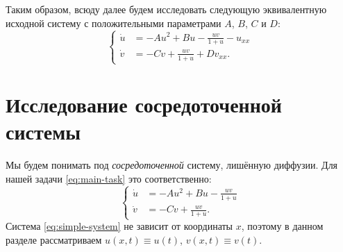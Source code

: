 \documentclass[a4paper, 11pt]{article}
\begin{document}
	Таким образом, всюду далее будем исследовать следующую эквивалентную исходной систему с положительными параметрами $A$, $B$, $C$ и $D$:
	\begin{equation}\label{eq:main-task}
		\left\{\begin{aligned}
		\dot u &= -A u^2 + B u - \frac{uv}{1+u} - u_{xx}\\
		\dot v &= -C v + \frac{uv}{1+u} + Dv_{xx}.
		\end{aligned}\right.
	\end{equation}


	\section{Исследование сосредоточенной системы}
	Мы будем понимать под \textit{сосредоточенной} систему, лишённую диффузии.
	Для нашей задачи \eqref{eq:main-task} это соответственно:
	\begin{equation}\label{eq:simple-system}
		\left\{\begin{aligned}
		\dot u &= -A u^2 + Bu - \frac{uv}{1 + u}\\
		\dot v &= -C v + \frac{uv}{1 + u}.
		\end{aligned}\right.
	\end{equation}
	Система \eqref{eq:simple-system} не зависит от координаты $x$, поэтому в данном разделе рассматриваем $u(x,t) \equiv u(t)$, $v(x, t) \equiv v(t)$.
\end{document}
